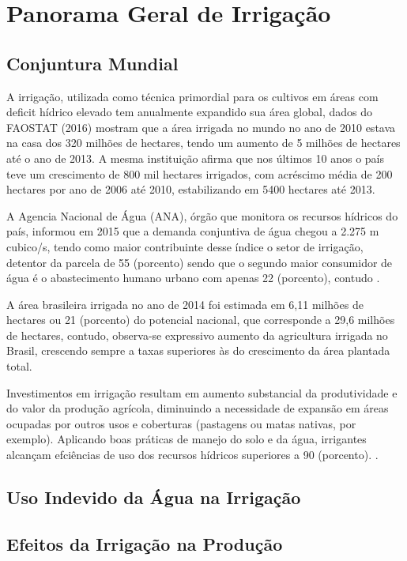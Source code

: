 \chapter{Panorama Geral de Irrigação}
\label{CAP2}



\section{Conjuntura Mundial}\label{Sub:equa}

A irrigação, utilizada como técnica primordial para os cultivos em áreas com deficit hídrico elevado tem anualmente expandido sua área global, dados do FAOSTAT (2016) mostram que a área irrigada no mundo no ano de 2010 estava na casa dos 320 milhões de hectares, tendo um aumento de 5 milhões de hectares até o ano de 2013.
A mesma instituição afirma que nos últimos 10 anos o país teve um crescimento de 800 mil hectares irrigados, com acréscimo média de 200 hectares por ano de 2006 até 2010, estabilizando em 5400 hectares até 2013.  

A Agencia Nacional de Água (ANA), órgão que monitora os recursos hídricos do país, informou em 2015 que a demanda conjuntiva de água chegou a 2.275 m cubico/s, tendo como maior contribuinte desse índice o setor de irrigação, detentor da parcela de 55 (porcento) sendo que o segundo maior consumidor de água é o abastecimento humano urbano com apenas 22 (porcento), contudo .

A área brasileira irrigada no ano de 2014 foi estimada em 6,11 milhões de hectares  ou 21 (porcento) do potencial nacional, que corresponde a 29,6 milhões de hectares, contudo, observa-se expressivo aumento da agricultura irrigada no Brasil, crescendo sempre a taxas superiores às do crescimento da área plantada total.

Investimentos em irrigação resultam em aumento substancial da produtividade e do valor da produção agrícola, diminuindo a necessidade de expansão em áreas ocupadas por outros usos e coberturas (pastagens ou matas nativas, por exemplo). Aplicando boas práticas de manejo do solo e da água, irrigantes alcançam efciências de uso dos recursos hídricos superiores a 90 (porcento). \cite{ana2015}.

\section{Uso Indevido da Água na Irrigação}

\section{Efeitos da Irrigação na Produção}

